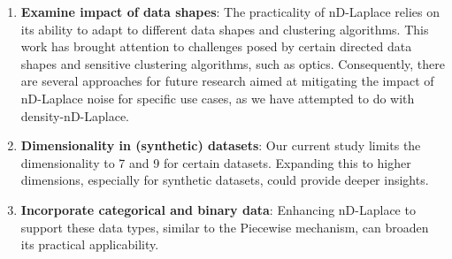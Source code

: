 \begin{enumerate}
\item \textbf{Examine impact of data shapes}: The practicality of nD-Laplace relies on its ability to adapt to different data shapes and clustering algorithms. This work has brought attention to challenges posed by certain directed data shapes and sensitive clustering algorithms, such as \gls{optics}. Consequently, there are several approaches for future research aimed at mitigating the impact of nD-Laplace noise for specific use cases, as we have attempted to do with density-nD-Laplace.
\item \textbf{Dimensionality in (synthetic) datasets}: Our current study limits the dimensionality to 7 and 9 for certain datasets. Expanding this to higher dimensions, especially for synthetic datasets, could provide deeper insights. 
\item \textbf{Incorporate categorical and binary data}: Enhancing nD-Laplace to support these data types, similar to the Piecewise mechanism, can broaden its practical applicability. 
\end{enumerate}

